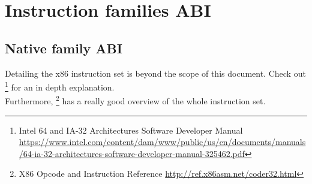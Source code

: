 \documentclass[12pt]{report}
\begin{document}
\chapter{Instruction families ABI}
\label{chapter:instruction-families-abi}
\section{Native family ABI}
\label{sec:native-family-abi}
Detailing the x86 instruction set is beyond the scope of this document. Check out \footnote{Intel 64 and IA-32 Architectures Software Developer Manual \url{https://www.intel.com/content/dam/www/public/us/en/documents/manuals/64-ia-32-architectures-software-developer-manual-325462.pdf}} for an in depth explanation.\\
\newline
Furthermore, \footnote{X86 Opcode and Instruction Reference \url{http://ref.x86asm.net/coder32.html}} has a really good overview of the whole instruction set.\\
\end{document}
